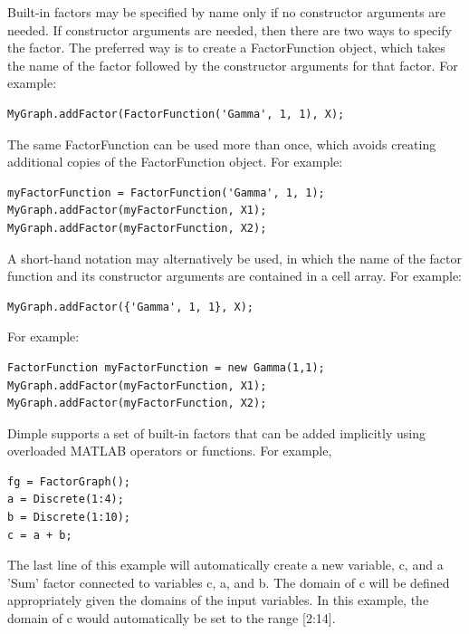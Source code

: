 Built-in factors may be specified by name only if no constructor arguments are needed.  If constructor arguments are needed, then there are two ways to specify the factor.  The preferred way is to create a FactorFunction object, which takes the name of the factor followed by the constructor arguments for that factor.  For example:

\begin{lstlisting}
MyGraph.addFactor(FactorFunction('Gamma', 1, 1), X);
\end{lstlisting}

The same FactorFunction can be used more than once, which avoids creating additional copies of the FactorFunction object.  For example:

\begin{lstlisting}
myFactorFunction = FactorFunction('Gamma', 1, 1);
MyGraph.addFactor(myFactorFunction, X1);
MyGraph.addFactor(myFactorFunction, X2);
\end{lstlisting}

A short-hand notation may alternatively be used, in which the name of the factor function and its constructor arguments are contained in a cell array.  For example:

\begin{lstlisting}
MyGraph.addFactor({'Gamma', 1, 1}, X);
\end{lstlisting}

\fi

\ifjava

For example:

\begin{lstlisting}
FactorFunction myFactorFunction = new Gamma(1,1);
MyGraph.addFactor(myFactorFunction, X1);
MyGraph.addFactor(myFactorFunction, X2);
\end{lstlisting}


\fi

\ifmatlab

\label{sec:ImplicitFactorCreation}

Dimple supports a set of built-in factors that can be added implicitly using overloaded MATLAB operators or functions.  For example,

\begin{lstlisting}
fg = FactorGraph();
a = Discrete(1:4);
b = Discrete(1:10);
c = a + b;
\end{lstlisting}

The last line of this example will automatically create a new variable, c, and a 'Sum' factor connected to variables c, a, and b.  The domain of c will be defined appropriately given the domains of the input variables.  In this example, the domain of c would automatically be set to the range [2:14].

